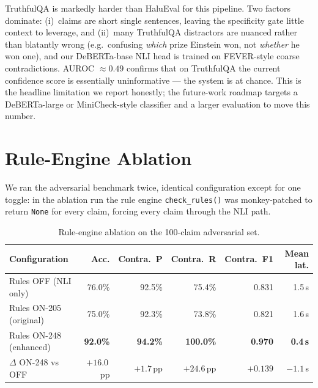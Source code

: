 \documentclass[12pt, a4paper, oneside]{report}
\begin{document}
TruthfulQA is markedly harder than HaluEval for this pipeline. Two factors dominate: (i)~claims are short single sentences, leaving the specificity gate little context to leverage, and (ii)~many TruthfulQA distractors are nuanced rather than blatantly wrong (e.g.\ confusing \emph{which} prize Einstein won, not \emph{whether} he won one), and our DeBERTa-base NLI head is trained on FEVER-style coarse contradictions. AUROC $\approx 0.49$ confirms that on TruthfulQA the current confidence score is essentially uninformative --- the system is at chance. This is the headline limitation we report honestly; the future-work roadmap targets a DeBERTa-large or MiniCheck-style classifier and a larger evaluation to move this number.

\section{Rule-Engine Ablation}

We ran the adversarial benchmark twice, identical configuration except for one toggle: in the ablation run the rule engine \texttt{check\_rules()} was monkey-patched to return \texttt{None} for every claim, forcing every claim through the NLI path.

\begin{table}[H]
\centering
\caption{Rule-engine ablation on the 100-claim adversarial set.}
\label{tab:rule_ablation}
\begin{tabular}{l r r r r r}
\toprule
\textbf{Configuration} & \textbf{Acc.} & \textbf{Contra.~P} & \textbf{Contra.~R} & \textbf{Contra.~F1} & \textbf{Mean lat.} \\
\midrule
Rules OFF (NLI only)        & 76.0\% & 92.5\% & 75.4\% & 0.831 & 1.5\,s \\
Rules ON-205 (original)     & 75.0\% & 92.3\% & 73.8\% & 0.821 & 1.6\,s \\
Rules ON-248 (enhanced)     & \textbf{92.0\%} & \textbf{94.2\%} & \textbf{100.0\%} & \textbf{0.970} & \textbf{0.4\,s} \\
\midrule
$\Delta$ ON-248 vs OFF      & $+16.0$\,pp & $+1.7$\,pp & $+24.6$\,pp & $+0.139$ & $-1.1$\,s \\
\bottomrule
\end{tabular}
\end{table}
\end{document}
